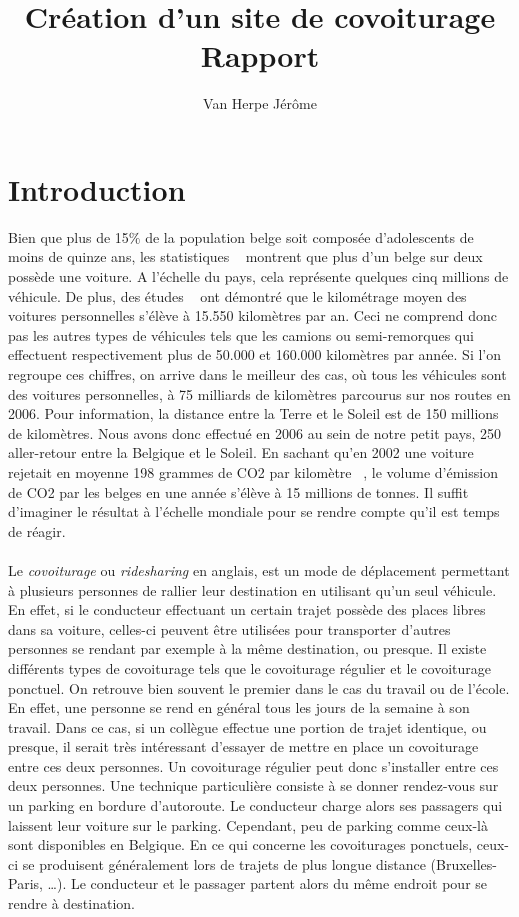 \documentclass[12pt, a4paper, oneside]{article}
\title{Création d'un site de covoiturage\\ \bigskip{} Rapport}
\author{Van Herpe Jérôme}
\begin{document}
\maketitle
\newpage
\null
\newpage
\renewcommand{\leftmark}{TABLE DES MATI\`{E}RES}
\thispagestyle{fancy}
\tableofcontents
\newpage
\section{Introduction}
    Bien que plus de 15$\%$ de la population belge soit composée d'adolescents de moins de quinze ans, les statistiques ~\cite{stats-mondiale} montrent que plus d'un belge sur deux possède une voiture. A l'échelle du pays, cela représente quelques cinq millions de véhicule. De plus, des études ~\cite{stats-ecologie} ont démontré que le kilométrage moyen des voitures personnelles s'élève à 15.550 kilomètres par an. Ceci ne comprend donc pas les autres types de véhicules tels que les camions ou semi-remorques qui effectuent respectivement plus de 50.000 et 160.000 kilomètres par année. Si l'on regroupe ces chiffres, on arrive dans le meilleur des cas, où tous les véhicules sont des voitures personnelles, à 75 milliards de kilomètres parcourus sur nos routes en 2006. Pour information, la distance entre la Terre et le Soleil est de 150 millions de kilomètres. Nous avons donc effectué en 2006 au sein de notre petit pays, 250 aller-retour entre la Belgique et le Soleil. En sachant qu'en 2002 une voiture rejetait en moyenne 198 grammes de CO2 par kilomètre ~\cite{stats-co2}, le volume d'émission de CO2 par les belges en une année s'élève à 15 millions de tonnes. Il suffit d'imaginer le résultat à l'échelle mondiale pour se rendre compte qu'il est temps de réagir.\\\\
    \indent Le \textit{covoiturage} ou \textit{ridesharing} en anglais, est un mode de déplacement permettant à plusieurs personnes de rallier leur destination en utilisant qu'un seul véhicule. En effet, si le conducteur effectuant un certain trajet possède des places libres dans sa voiture, celles-ci peuvent être utilisées pour transporter d'autres personnes se rendant par exemple à la même destination, ou presque. Il existe différents types de covoiturage tels que le covoiturage régulier et le covoiturage ponctuel. On retrouve bien souvent le premier dans le cas du travail ou de l'école. En effet, une personne se rend en général tous les jours de la semaine à son travail. Dans ce cas, si un collègue effectue une portion de trajet identique, ou presque, il serait très intéressant d'essayer de mettre en place un covoiturage entre ces deux personnes. Un covoiturage régulier peut donc s'installer entre ces deux personnes. Une technique particulière consiste à se donner rendez-vous sur un parking en bordure d'autoroute. Le conducteur charge alors ses passagers qui laissent leur voiture sur le parking. Cependant, peu de parking comme ceux-là sont disponibles en Belgique. En ce qui concerne les covoiturages ponctuels, ceux-ci se produisent généralement lors de trajets de plus longue distance (Bruxelles-Paris, \dots). Le conducteur et le passager partent alors du même endroit pour se rendre à destination.\\\\
\end{document}
